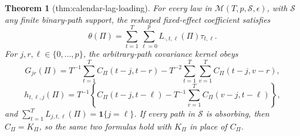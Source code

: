 \documentclass{article}
\newtheorem{theorem}{Theorem}
\begin{document}
\begin{theorem}[thm:calendar-lag-loading]\label{thm:calendar-lag-loading}
For every law in \(\mathcal M(T,p,\mathcal S,\epsilon)\), with \(\mathcal S\) any finite binary-path support, the reshaped fixed-effect coefficient satisfies
\[
 \theta(\Pi)=\sum_{t=1}^{T}\sum_{\ell=0}^{p}L_{\cdot,t,\ell}(\Pi)\tau_{t,\ell}.
\]
For \(j,r,\ell\in\{0,\ldots,p\}\), the arbitrary-path covariance kernel obeys
\[
 G_{jr}(\Pi)=T^{-1}\sum_{t=1}^{T}C_{\Pi}(t-j,t-r)
 -T^{-2}\sum_{t=1}^{T}\sum_{v=1}^{T}C_{\Pi}(t-j,v-r),
\]
\[
 h_{t,\ell,j}(\Pi)=T^{-1}\left\{C_{\Pi}(t-j,t-\ell)
 -T^{-1}\sum_{v=1}^{T}C_{\Pi}(v-j,t-\ell)\right\},
\]
and \(\sum_{t=1}^{T}L_{j,t,\ell}(\Pi)=\mathbf 1\{j=\ell\}\).  If every path in \(\mathcal S\) is absorbing, then \(C_{\Pi}=K_{\Pi}\), so the same two formulas hold with \(K_{\Pi}\) in place of \(C_{\Pi}\).
\end{theorem}
\end{document}
